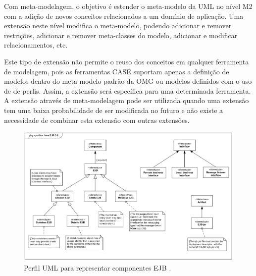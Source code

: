Com meta-modelagem, o objetivo é estender o meta-modelo da UML no nível M2 com a adição de novos conceitos relacionados a um domínio de aplicação. Uma
extensão neste nível modifica o meta-modelo, podendo adicionar e remover restrições, adicionar e remover meta-classes do modelo, adicionar e
modificar relacionamentos, etc. 

Este tipo de extensão não permite o reuso dos conceitos em qualquer ferramenta de modelagem, pois as ferramentas CASE suportam apenas a definição de
modelos dentro do meta-modelo padrão da OMG ou modelos definidos com o uso de de perfis. Assim, a extensão será específica para uma determinada
ferramenta. A extensão através de meta-modelagem pode ser utilizada quando uma extensão tem uma baixa probabilidade de ser modificada no futuro e não
existe a necessidade de combinar esta extensão com outras extensões.

\begin{landscape}
\begin{figure}[!H]
	\centering
	\includegraphics{img/ejb_profile.png}
	\caption{Perfil UML para representar componentes EJB \cite{ejbprofile:12}.}\label{fig:ejb_profile}
\end{figure}
\end{landscape}